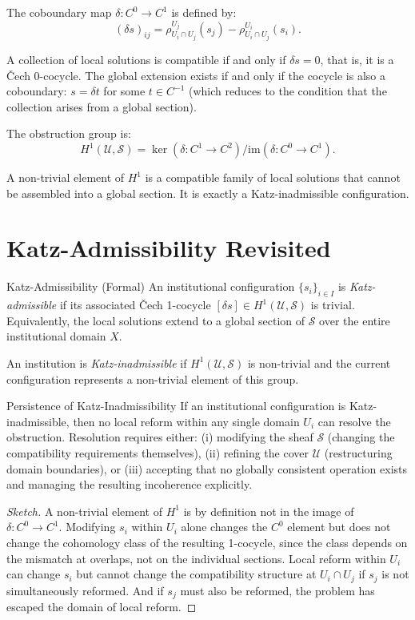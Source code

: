 The coboundary map $\delta: C^0 \to C^1$ is defined by:
\[
  (\delta s)_{ij} = \rho^{U_j}_{U_i \cap U_j}(s_j) - \rho^{U_i}_{U_i \cap U_j}(s_i).
\]

A collection of local solutions is compatible if and only if $\delta s = 0$,
that is, it is a Čech 0-cocycle. The global extension exists if and only if
the cocycle is also a coboundary: $s = \delta t$ for some $t \in C^{-1}$
(which reduces to the condition that the collection arises from a global section).

The obstruction group is:
\[
  H^1(\mathcal{U}, \mathcal{S}) = \ker(\delta: C^1 \to C^2) / \mathrm{im}(\delta: C^0 \to C^1).
\]

A non-trivial element of $H^1$ is a compatible family of local solutions that
cannot be assembled into a global section. It is exactly a Katz-inadmissible
configuration.

\section{Katz-Admissibility Revisited}

\begin{definition}{Katz-Admissibility (Formal)}
An institutional configuration $\{s_i\}_{i \in I}$ is \emph{Katz-admissible}
if its associated Čech 1-cocycle $[\delta s] \in H^1(\mathcal{U}, \mathcal{S})$
is trivial. Equivalently, the local solutions extend to a global section of
$\mathcal{S}$ over the entire institutional domain $X$.

An institution is \emph{Katz-inadmissible} if $H^1(\mathcal{U}, \mathcal{S})$
is non-trivial and the current configuration represents a non-trivial element
of this group.
\end{definition}

\begin{proposition}{Persistence of Katz-Inadmissibility}
If an institutional configuration is Katz-inadmissible, then no local reform
within any single domain $U_i$ can resolve the obstruction. Resolution requires
either: (i) modifying the sheaf $\mathcal{S}$ (changing the compatibility
requirements themselves), (ii) refining the cover $\mathcal{U}$ (restructuring
domain boundaries), or (iii) accepting that no globally consistent operation
exists and managing the resulting incoherence explicitly.
\end{proposition}

\begin{proof}[Sketch]
A non-trivial element of $H^1$ is by definition not in the image of $\delta:
C^0 \to C^1$. Modifying $s_i$ within $U_i$ alone changes the $C^0$ element
but does not change the cohomology class of the resulting 1-cocycle, since the
class depends on the mismatch at overlaps, not on the individual sections.
Local reform within $U_i$ can change $s_i$ but cannot change the compatibility
structure at $U_i \cap U_j$ if $s_j$ is not simultaneously reformed. And if
$s_j$ must also be reformed, the problem has escaped the domain of local reform.
\end{proof}

